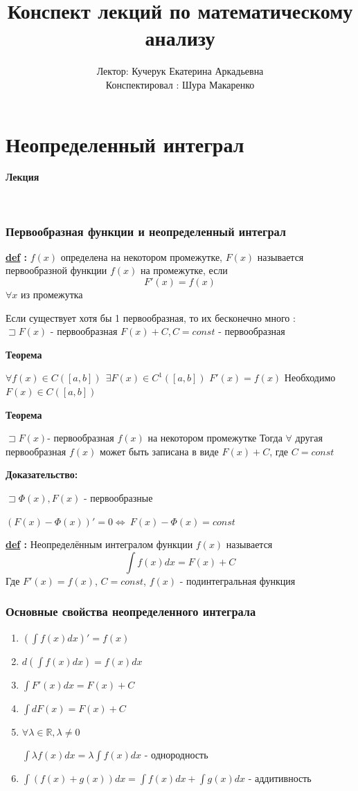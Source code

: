 \documentclass[a4paper,11pt]{article}
\title{Конспект лекций по математическому анализу}
\author{Лектор: Кучерук Екатерина Аркадьевна \\ Конспектировал : Шура Макаренко}
\date{}
\newcounter{lecture}
\newcommand{\lecture}{ \noindent
\noindent \LARGE \textbf{
Лекция \thelecture  
\stepcounter{lecture}} \large 

\

}
\newcommand{\Def}[1]{ 
\noindent\makebox[\linewidth]{\rule{\textwidth}{1pt}} 

 \noindent \textbf{\underline{def} :}
#1 

\noindent\makebox[\linewidth]{\rule{\textwidth}{1pt}} }
\newcommand{\R}{\mathbb{R}}
\newcommand{\Let}{\sqsupset}
\begin{document}
\maketitle
 \setcounter{tocdepth}{5}
\tableofcontents
\newpage
\part{Неопределенный интеграл}

\lecture

\section{Первообразная функции и неопределенный интеграл}

\Def{\label{def:int} $f(x)$ определена на некотором промежутке, $F(x)$ называется первообразной функции $f(x)$ на промежутке, если 
\[
F'(x) = f(x)
\] 
$\forall x$  из промежутка }

Если существует хотя бы 1 первообразная, то их бесконечно много :\\ $\Let F(x)$ - первообразная  $ F(x) + C, C = const $ - первообразная 

\textbf{Теорема}

$
\forall f(x) \in C([a,b]) \ \ \exists F(x) \in C^1 ([a,b])
$ 
$F'(x) = f(x)$
Необходимо $F(x) \in C([a,b])$

\textbf{Теорема} 

$\Let F(x) $-  первообразная $f(x)$ на некотором промежутке 
Тогда $\forall$ другая первообразная $f(x)$ может быть записана в виде $F(x) + C$, где $C = const$

\textbf{Доказательство:}

$\Let \Phi(x), F(x)$ - первообразные 

$(F(x) - \Phi(x))' = 0 \Leftrightarrow \ F(x) - \Phi(x) = const$

\Def{Неопределённым интегралом функции $f(x)$ называется 
\[
\int f(x) dx = F(x) + C
\]
Где $F'(x) = f(x)$, $C = const$, $f(x)$ - подинтегральная функция
}

\section{Основные свойства неопределенного интеграла}

\begin{enumerate}
	\item $(\int f(x) dx )' = f(x)$
	\item $d(\int f(x) dx) = f(x)dx$
	\item $\int F'(x)dx = F(x) + C$
	\item $\int dF(x) = F(x) + C$
	\item $\forall \lambda \in \R, \lambda \neq 0$
	
	$\int \lambda f(x) dx = \lambda \int f(x)dx$ - однородность
	
	\item $\int (f(x) + g(x))dx = \int f(x)dx + \int g(x)dx$ - аддитивность 
	 
\end{enumerate}
\end{document}
